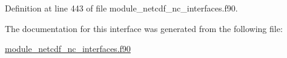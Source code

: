Definition at line 443 of file module\+\_\+netcdf\+\_\+nc\+\_\+interfaces.\+f90.



The documentation for this interface was generated from the following file\+:\begin{DoxyCompactItemize}
\item 
\hyperlink{module__netcdf__nc__interfaces_8f90}{module\+\_\+netcdf\+\_\+nc\+\_\+interfaces.\+f90}\end{DoxyCompactItemize}
